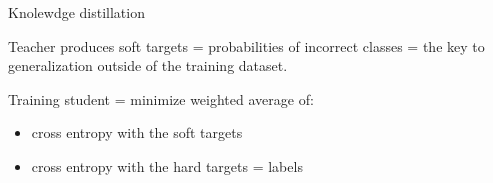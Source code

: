\documentclass{beamer}
\begin{document}
\begin{frame}{Knolewdge distillation}

Teacher produces soft targets = probabilities of incorrect classes = the key to generalization outside of the training dataset.

\vfill

Training student = minimize weighted average of:

\begin{itemize}
\item cross entropy with the soft targets
\item cross entropy with the hard targets = labels
\end{itemize}


\end{frame}
\end{document}
